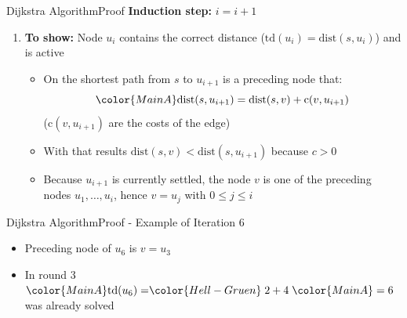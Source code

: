 \begin{frame}{Dijkstra Algorithm}{Proof}
  \textbf{Induction step:} {\color{MainA}$i = i+1$}
  \begin{enumerate}
    \item
      \textbf{To show:} Node {\color{MainA}$u_i$} contains the correct
      distance ({\color{MainA}$\mathrm{td}(u_i) = \mathrm{dist}(s, u_i)$})
      and is active
      \begin{itemize}
        \item
          On the shortest path from {\color{MainA}$s$} to
          {\color{MainA}$u_{i+1}$} is a preceding node that:
          \begin{displaymath}
            \color{MainA}\mathrm{dist}(s, u_{i+1})
            = \mathrm{dist}(s, v) + \mathrm{c}(v, u_{i+1})
          \end{displaymath}
          ({\color{MainA}$\mathrm{c}(v, u_{i+1})$} are the costs of the edge)
          \begin{figure}[!h]
            \begin{adjustbox}{width=0.9\linewidth}
              \def\DijkstraTD{0}%
              
            \end{adjustbox}
          \end{figure}
        \item
          With that results
          {\color{MainA}$\mathrm{dist}(s, v) < \mathrm{dist}(s, u_{i+1})$}
          because {\color{MainA}$c > 0$}
        \item
          Because {\color{MainA}$u_{i+1}$} is currently settled, the node
          {\color{MainA}$v$} is one of the preceding nodes
          {\color{MainA}$u_1, \dots, u_i$}, hence
          {\color{MainA}$v = u_j$} with
          {\color{MainA}$0 \leq j \leq i$}
      \end{itemize}
  \end{enumerate}
\end{frame}


\begin{frame}{Dijkstra Algorithm}{Proof - Example of Iteration 6}
  \begin{figure}[!h]
    \begin{adjustbox}{width=0.9\linewidth}
      
    \end{adjustbox}
  \end{figure}
  \begin{itemize}
    \item
      Preceding node of {\color{MainA}$u_6$} is
      {\color{MainA}$v = u_3$}
    \item
      In round 3
      \begin{math}
        {\color{MainA}\mathrm{td}(u_6) = }
        {\color{Hell-Gruen}\;2 + 4\;}
        {\color{MainA} = 6}
      \end{math}
      was already solved
  \end{itemize}
\end{frame}

